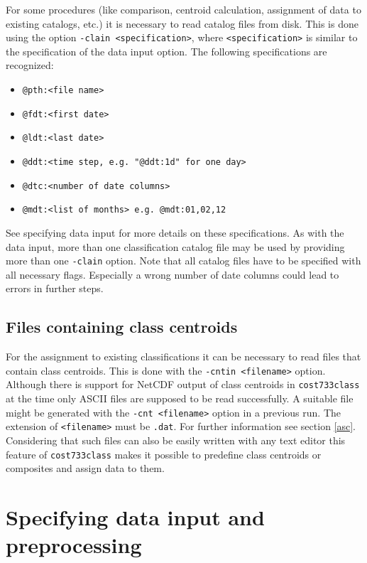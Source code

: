 \documentclass[12pt, oneside, a4paper, headsepline, plainheadsepline]{scrbook}
\begin{document}
For some procedures (like comparison, centroid calculation, assignment of data to existing catalogs, etc.) it is necessary
to read catalog files from disk. This is done using the option \verb+-clain <specification>+, where \verb+<specification>+ 
is similar to the specification of the data input option. The following specifications are recognized:
\begin{itemize}
\item  \verb+@pth:<file name>+
\item  \verb+@fdt:<first date>+
\item  \verb+@ldt:<last date>+
\item  \verb+@ddt:<time step, e.g. "@ddt:1d" for one day>+
\item  \verb+@dtc:<number of date columns>+
\item  \verb+@mdt:<list of months> e.g. @mdt:01,02,12+
\end{itemize}
See specifying data input for more details on these specifications. As with the data input, more than one classification catalog file 
may be used by providing more than one  \verb+-clain+ option. Note that all catalog files have to be specified with all necessary flags. Especially a wrong number of date columns could lead to errors in further steps.

\subsection{Files containing class centroids}
For the assignment to existing classifications it can be necessary to read files that contain class centroids. This is done with the \verb+-cntin <filename>+ option. Although there is support for NetCDF output of class centroids in 
\verb+cost733class+ at the time only ASCII files are supposed to be read successfully. A suitable file might be generated with the \verb+-cnt <filename>+ option in a previous run. The extension
of \verb+<filename>+ must be \verb+.dat+. For further information see section \ref{asc}.\\
Considering that such files can also be easily written with any text editor this feature of \verb+cost733class+ makes it possible to predefine class centroids or composites and assign data to them.

\section{Specifying data input and preprocessing}
\end{document}
